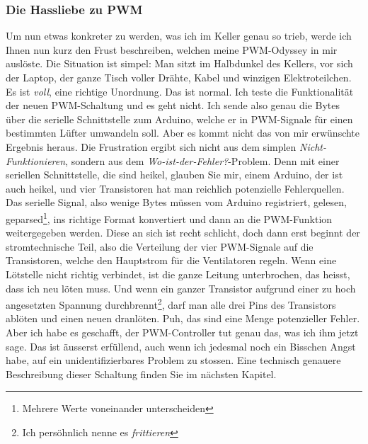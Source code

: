 \documentclass[12pt,titlepage,a4paper]{article}
\begin{document}
\subsubsection{Die Hassliebe zu PWM}
Um nun etwas konkreter zu werden, was ich im Keller genau so trieb, werde ich Ihnen nun kurz den Frust beschreiben, welchen meine PWM-Odyssey in mir auslöste. Die Situation ist simpel: Man sitzt im Halbdunkel des Kellers, vor sich der Laptop, der ganze Tisch voller Drähte, Kabel und winzigen Elektroteilchen. Es ist \textit{voll}, eine richtige Unordnung. Das ist normal. Ich teste die Funktionalität der neuen PWM-Schaltung und es geht nicht. Ich sende also genau die Bytes über die serielle Schnittstelle zum Arduino, welche er in PWM-Signale für einen bestimmten Lüfter umwandeln soll. Aber es kommt nicht das von mir erwünschte Ergebnis heraus. Die Frustration ergibt sich nicht aus dem simplen \textit{Nicht-Funktionieren}, sondern aus dem \textit{Wo-ist-der-Fehler?}-Problem. Denn mit einer seriellen Schnittstelle, die sind heikel, glauben Sie mir, einem Arduino, der ist auch heikel, und vier Transistoren hat man reichlich potenzielle Fehlerquellen. Das serielle Signal, also wenige Bytes müssen vom Arduino registriert, gelesen, geparsed\footnote{Mehrere Werte voneinander unterscheiden}, ins richtige Format konvertiert und dann an die PWM-Funktion weitergegeben werden. Diese an sich ist recht schlicht, doch dann erst beginnt der stromtechnische Teil, also die Verteilung der vier PWM-Signale auf die Transistoren, welche den Hauptstrom für die Ventilatoren regeln. Wenn eine Lötstelle nicht richtig verbindet, ist die ganze Leitung unterbrochen, das heisst, dass ich neu löten muss. Und wenn ein ganzer Transistor aufgrund einer zu hoch angesetzten Spannung durchbrennt\footnote{Ich persöhnlich nenne es \textit{frittieren}}, darf man alle drei Pins des Transistors ablöten und einen neuen dranlöten. Puh, das sind eine Menge potenzieller Fehler. Aber ich habe es geschafft, der PWM-Controller tut genau das, was ich ihm jetzt sage. Das ist äusserst erfüllend, auch wenn ich jedesmal noch ein Bisschen Angst habe, auf ein unidentifizierbares Problem zu stossen. Eine technisch genauere Beschreibung dieser Schaltung finden Sie im nächsten Kapitel.
\end{document}
